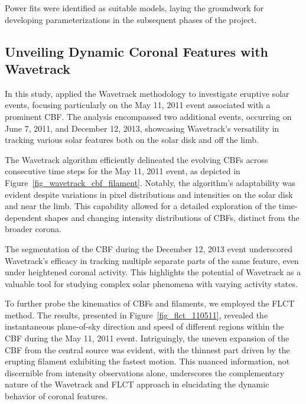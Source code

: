 
Power fits were identified as suitable models, laying the groundwork for developing parameterizations in the subsequent phases of the project.

\subsection{Unveiling Dynamic Coronal Features with Wavetrack}
In this study, \citet{stepanyuk_2022} applied the Wavetrack methodology to investigate eruptive solar events, focusing particularly on the May 11, 2011 event associated with a prominent CBF. The analysis encompassed two additional events, occurring on June 7, 2011, and December 12, 2013, showcasing Wavetrack's versatility in tracking various solar features both on the solar disk and off the limb.

The Wavetrack algorithm efficiently delineated the evolving CBFs across consecutive time steps for the May 11, 2011 event, as depicted in Figure~\ref{fig_wavetrack_cbf_filament}. Notably, the algorithm's adaptability was evident despite variations in pixel distributions and intensities on the solar disk and near the limb. This capability allowed for a detailed exploration of the time-dependent shapes and changing intensity distributions of CBFs, distinct from the broader corona.

The segmentation of the CBF during the December 12, 2013 event underscored Wavetrack's efficacy in tracking multiple separate parts of the same feature, even under heightened coronal activity. This highlights the potential of Wavetrack as a valuable tool for studying complex solar phenomena with varying activity states.

To further probe the kinematics of CBFs and filaments, we employed the FLCT method. The results, presented in Figure~\ref{fig_flct_110511}, revealed the instantaneous plane-of-sky direction and speed of different regions within the CBF during the May 11, 2011 event. Intriguingly, the uneven expansion of the CBF from the central source was evident, with the thinnest part driven by the erupting filament exhibiting the fastest motion. This nuanced information, not discernible from intensity observations alone, underscores the complementary nature of the Wavetrack and FLCT approach in elucidating the dynamic behavior of coronal features.

